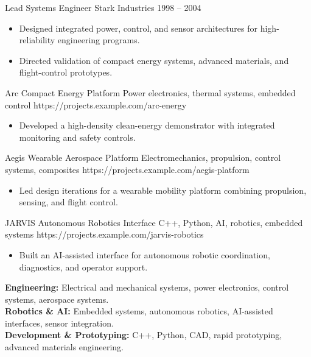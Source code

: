 \resumeentry
    {Lead Systems Engineer}
    {Stark Industries}
    {1998 -- 2004}
\begin{itemize}
    \item Designed integrated power, control, and sensor architectures for high-reliability engineering programs.
    \item Directed validation of compact energy systems, advanced materials, and flight-control prototypes.
\end{itemize}

\resumesection{\projectstitle}

\resumeproject
    {Arc Compact Energy Platform}
    {Power electronics, thermal systems, embedded control}
    {https://projects.example.com/arc-energy}
\begin{itemize}
    \item Developed a high-density clean-energy demonstrator with integrated monitoring and safety controls.
\end{itemize}

\resumeproject
    {Aegis Wearable Aerospace Platform}
    {Electromechanics, propulsion, control systems, composites}
    {https://projects.example.com/aegis-platform}
\begin{itemize}
    \item Led design iterations for a wearable mobility platform combining propulsion, sensing, and flight control.
\end{itemize}

\resumeproject
    {JARVIS Autonomous Robotics Interface}
    {C++, Python, AI, robotics, embedded systems}
    {https://projects.example.com/jarvis-robotics}
\begin{itemize}
    \item Built an AI-assisted interface for autonomous robotic coordination, diagnostics, and operator support.
\end{itemize}

\resumesection{\skillstitle}

\textbf{Engineering:} Electrical and mechanical systems, power electronics, control systems, aerospace systems. \\
\textbf{Robotics \& AI:} Embedded systems, autonomous robotics, AI-assisted interfaces, sensor integration. \\
\textbf{Development \& Prototyping:} C++, Python, CAD, rapid prototyping, advanced materials engineering.

